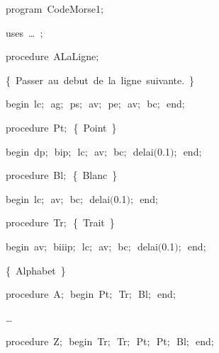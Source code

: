 
{
\parindent {}
\medskip

\carrenoir
\vspace{\neglskip}\mbox{\blc  \idt  \mcl program\idt {}\ CodeMorse1$;$
}\par 
\vspace{\neglskip}\mbox{\blc \blk\idt \mcl uses\idt \ \ldots\ $;$
}\par 
\medskip

\pagebreak[3] 
\vspace{\neglskip}\mbox{\blc  \blk\idt  \mcl procedure\idt \ ALaLigne$;$}\par 
\vspace{\neglskip}\mbox{\blc  \blk\blk\idt  \cmt  \{\ Passer\ au\ debut\ de\ la\ ligne\ suivante.\ \}\idt }\par 
\vspace{\neglskip}\mbox{\blc  \blk\idt  \mcl begin\idt \ lc$;$\ ag$;$\ ps$;$\ av$;$\ pe$;$\ av$;$\ bc$;$\ \mcl end\idt $;$}\par 
\medskip

\pagebreak[3] 
\vspace{\neglskip}\mbox{\blc  \blk\idt  \mcl procedure\idt \ Pt$;$\ \cmt  \{\ Point\ \}\idt }\par 
\vspace{\neglskip}\mbox{\blc  \blk\idt  \mcl begin\idt \ dp$;$\ bip$;$\ lc$;$\ av$;$\ bc$;$\ delai$($0$.$1$)$$;$\ \mcl end\idt $;$}\par 
\medskip

\pagebreak[3] 
\vspace{\neglskip}\mbox{\blc  \blk\idt  \mcl procedure\idt \ Bl$;$\ \cmt  \{\ Blanc\ \}\idt }\par 
\vspace{\neglskip}\mbox{\blc  \blk\idt  \mcl begin\idt \ lc$;$\ av$;$\ bc$;$\ delai$($0$.$1$)$$;$\ \mcl end\idt $;$}\par 
\medskip

\pagebreak[3] 
\vspace{\neglskip}\mbox{\blc  \blk\idt  \mcl procedure\idt \ Tr$;$\ \cmt  \{\ Trait\ \}\idt }\par 
\vspace{\neglskip}\mbox{\blc  \blk\idt  \mcl begin\idt \ av$;$\ biiip$;$\ lc$;$\ av$;$\ bc$;$\ delai$($0$.$1$)$$;$\ \mcl end\idt $;$}\par 
\medskip

\vspace{\neglskip}\mbox{\blc  \blk\idt  \cmt  \{\ Alphabet\ \}\idt }\par 
\pagebreak[3] 
\vspace{\neglskip}\mbox{\blc  \blk\idt  \mcl procedure\idt \ A$;$\ \mcl begin\idt \ Pt$;$\ Tr$;$\ Bl$;$\ \mcl end\idt $;$}\par 
\pagebreak[3] 
\vspace{\neglskip}\mbox{\blc  \blk\idt \ldots}\par 
\vspace{\neglskip}\mbox{\blc  \blk\idt  \mcl procedure\idt \ Z$;$\ \mcl begin\idt \ Tr$;$\ Tr$;$\ Pt$;$\ Pt$;$\ Bl$;$\ \mcl end\idt $;$}\par 
\medskip

}
